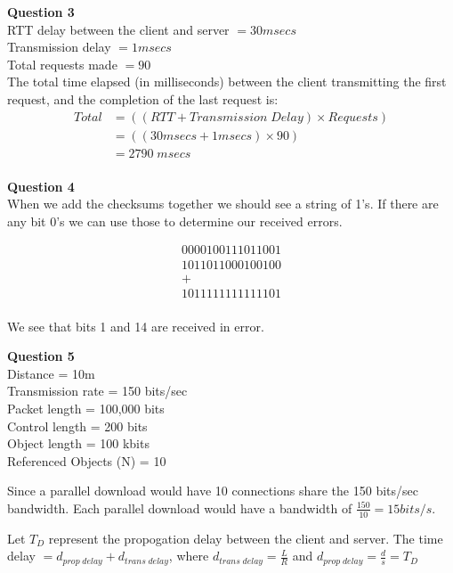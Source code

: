 \documentclass{article}
\begin{document}
\bigskip
{\bf Question 3}\\
RTT delay between the client and server $= 30msecs$\\
Transmission delay $=1msecs$\\
Total requests made $=90$\\
The total time elapsed (in milliseconds) between the client transmitting the first request, and the completion of the last request is:
\begin{equation*}
    \begin{split}
        Total &= ((RTT+Transmission \; Delay) \times Requests)\\
        &= ((30msecs+1msecs) \times 90)\\
        &= 2790 \; msecs\\
    \end{split}
\end{equation*}

\break
{\bf Question 4}\\
When we add the checksums together we should see a string of 1's. If there are any bit 0's we can use those to determine our received errors.

\begin{equation*}
    \begin{split}
        0000100111011001\\
        1011011000100100\\
        +\\
        1011111111111101\\
    \end{split}
\end{equation*}

We see that bits 1 and 14 are received in error.

\bigskip
{\bf Question 5}\\
Distance = 10m\\
Transmission rate = 150 bits/sec\\
Packet length = 100,000 bits\\
Control length = 200 bits\\
Object length = 100 kbits\\
Referenced Objects (N) = 10

\smallskip
Since a parallel download would have 10 connections share the 150 bits/sec bandwidth. Each parallel download would have a bandwidth of $\frac{150}{10}=15bits/s$.

\smallskip
Let $T_D$ represent the propogation delay between the client and server.
The time delay $=d_{prop\;delay}+d_{trans\;delay}$, where  $d_{trans\;delay}=\frac{L}{R}$ and $d_{prop\;delay}=\frac{d}{s}=T_D$
\end{document}
